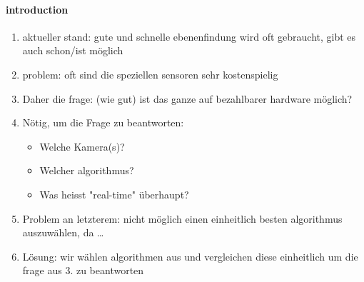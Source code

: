 \documentclass[main.tex]{subfiles}
\begin{document}


\paragraph*{introduction}
\begin{enumerate}
    \item aktueller stand: gute und schnelle ebenenfindung wird oft gebraucht, gibt es auch schon/ist möglich
    \item problem: oft sind die speziellen sensoren sehr kostenspielig
    \item Daher die frage: (wie gut) ist das ganze auf bezahlbarer hardware möglich?
    \item Nötig, um die Frage zu beantworten: 
        \begin{itemize}
            \item Welche Kamera(s)?
            \item Welcher algorithmus?
            \item Was heisst "real-time" überhaupt?
        \end{itemize} 
    \item Problem an letzterem: nicht möglich einen einheitlich besten algorithmus auszuwählen, da \dots{}
    \item Lösung: wir wählen algorithmen aus und vergleichen diese einheitlich um die frage aus 3. zu beantworten
\end{enumerate}

\end{document}
